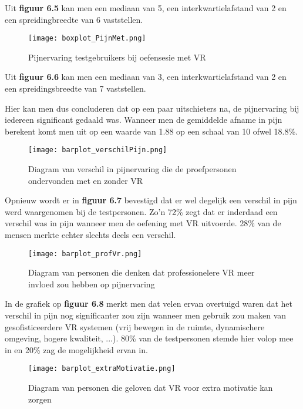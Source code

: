 Uit \textbf{figuur 6.5} kan men een mediaan van 5, een interkwartielafstand van 2 en een spreidingbreedte van 6 vaststellen.

\begin{figure}[h]
    \centering
    \texttt{[image: boxplot\_PijnMet.png]}
    \caption{Pijnervaring testgebruikers bij oefensesie met VR}
    \label{figuur 6.6}
\end{figure}

Uit \textbf{figuur 6.6} kan men een mediaan van 3, een interkwartielafstand van 2 en een spreidingsbreedte van 7 vaststellen.

Hier kan men dus concluderen dat op een paar uitschieters na, de pijnervaring bij iedereen significant gedaald was. Wanneer men de gemiddelde afname in pijn berekent komt men uit op een waarde van 1.88 op een schaal van 10 ofwel 18.8\%.

\begin{figure}[h]
    \centering
    \texttt{[image: barplot\_verschilPijn.png]}
    \caption{Diagram van verschil in pijnervaring die de proefpersonen ondervonden met en zonder VR}
    \label{figuur 6.7}
\end{figure}

\newpage

Opnieuw wordt er in \textbf{figuur 6.7} bevestigd dat er wel degelijk een verschil in pijn werd waargenomen bij de testpersonen. Zo'n 72\% zegt dat er inderdaad een verschil was in pijn wanneer men de oefening met VR uitvoerde. 28\% van de mensen merkte echter slechts deels een verschil.

\begin{figure}[h]
    \centering
    \texttt{[image: barplot\_profVr.png]}
    \caption{Diagram van personen die denken dat professionelere VR meer invloed zou hebben op pijnervaring}
    \label{figuur 6.8}
\end{figure}

In de grafiek op \textbf{figuur 6.8} merkt men dat velen ervan overtuigd waren dat het verschil in pijn nog significanter zou zijn wanneer men gebruik zou maken van gesofisticeerdere VR systemen (vrij bewegen in de ruimte, dynamischere omgeving, hogere kwaliteit, ...). 80\% van de testpersonen stemde hier volop mee in en 20\% zag de mogelijkheid ervan in.

\begin{figure}[h]
    \centering
    \texttt{[image: barplot\_extraMotivatie.png]}
    \caption{Diagram van personen die geloven dat VR voor extra motivatie kan zorgen}
    \label{figuur 6.9}
\end{figure}

